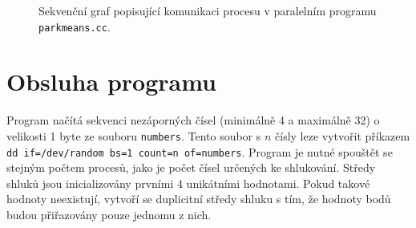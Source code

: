 \documentclass[a4paper, 11pt, fleqn]{scrartcl}
\begin{document}
    \newpage

    \begin{figure}[!ht]
      \centering
      \caption{Sekvenční graf popisující komunikaci procesu v paralelním programu \texttt{parkmeans.cc}.}
    \end{figure}



  \section{Obsluha programu}
    Program načítá sekvenci nezáporných čísel (minimálně 4 a maximálně 32) o velikosti 1 byte ze souboru \texttt{numbers}. Tento soubor s $n$ čísly leze vytvořit příkazem \texttt{dd if=/dev/random bs=1 count=n of=numbers}. Program je nutné spouštět se stejným počtem procesů, jako je počet čísel určených ke shlukování. Středy shluků jsou inicializovány prvními 4 unikátními hodnotami. Pokud takové hodnoty neexistují, vytvoří se duplicitní středy shluku s tím, že hodnoty bodů budou přiřazovány pouze jednomu z nich.
\end{document}
